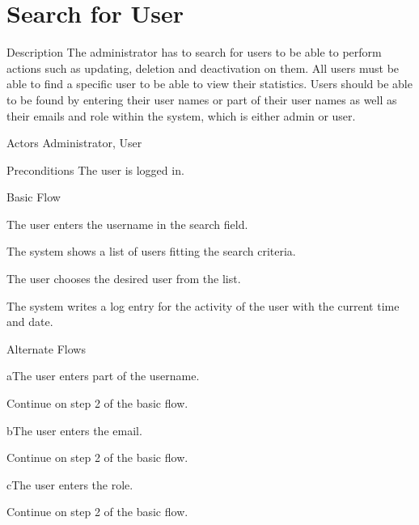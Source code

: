\section{Search for User}

%
\begin{cpart}{Description}
The administrator has to search for users to be able to perform actions such as updating, deletion and deactivation on them. All users must be able to find a specific user to be able to view their statistics. Users should be able to be found by entering their user names or part of their user names as well as their emails and role within the system, which is either admin or user.
\end{cpart}


%
\begin{cpart}{Actors}
Administrator, User
\end{cpart}

%
\begin{cpart}{Preconditions}
The user is logged in.
\end{cpart}

%
\begin{cpartList}{Basic Flow}
  \item The user enters the username in the search field.
  \item The system shows a list of users fitting the search criteria.
  \item The user chooses the desired user from the list.
  \item The system writes a log entry for the activity of the user with the current time and date.
\end{cpartList}

%
\begin{cpartList}{Alternate Flows}
  \begin{innerList}{1}{a}{The user enters part of the username.}
    \item Continue on step 2 of the basic flow.
  \end{innerList}
  \begin{innerList}{1}{b}{The user enters the email.}
    \item Continue on step 2 of the basic flow.
  \end{innerList}
  \begin{innerList}{1}{c}{The user enters the role.}
    \item Continue on step 2 of the basic flow.
  \end{innerList}
\end{cpartList}

